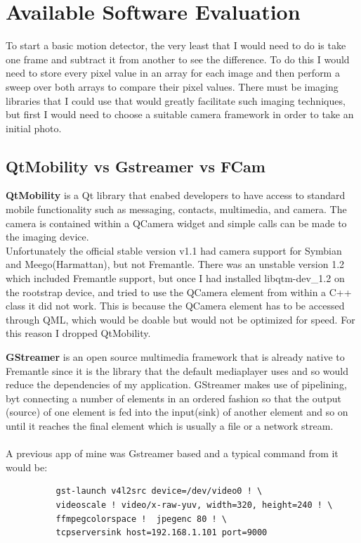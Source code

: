 \section{Available Software Evaluation}
To start a basic motion detector, the very least that I would need to do is take one frame and subtract it from another to see the difference. To do this I would need to store every pixel value in an array for each image and then perform a sweep over both arrays to compare their pixel values. There must be imaging libraries that I could use that would greatly facilitate such imaging techniques, but first I would need to choose a suitable camera framework in order to take an initial photo.

\subsection{QtMobility vs Gstreamer vs FCam}\label{gstreamertalk}

{\bf QtMobility} is a Qt library that enabed developers to have access to standard mobile functionality such as messaging, contacts, multimedia, and camera.  The camera is contained within a QCamera widget and simple calls can be made to the imaging device.
\\Unfortunately the official stable version v1.1 had camera support for Symbian and Meego(Harmattan), but not Fremantle. There was an unstable version 1.2 which included Fremantle support, but once I had installed libqtm-dev\_1.2 on the rootstrap device, and tried to use the QCamera element from within a C++ class it did not work. This is because the QCamera element has to be accessed through QML, which would be doable but would not be optimized for speed. For this reason I dropped QtMobility.

{\bf GStreamer} is an open source multimedia framework that is already native to Fremantle since it is the library that the default mediaplayer uses and so would reduce the dependencies of my application. GStreamer makes use of pipelining, byt connecting a number of elements in an ordered fashion so that the output (source) of one element is fed into the input(sink) of another element and so on until it reaches the final element which is usually a file or a network stream.
\\\\A previous app of mine was Gstreamer based and a typical command from it would be:
\label{gstreamer}
\begin{verbatim}
	      gst-launch v4l2src device=/dev/video0 ! \
	      videoscale ! video/x-raw-yuv, width=320, height=240 ! \
	      ffmpegcolorspace !  jpegenc 80 ! \
	      tcpserversink host=192.168.1.101 port=9000
\end{verbatim}


